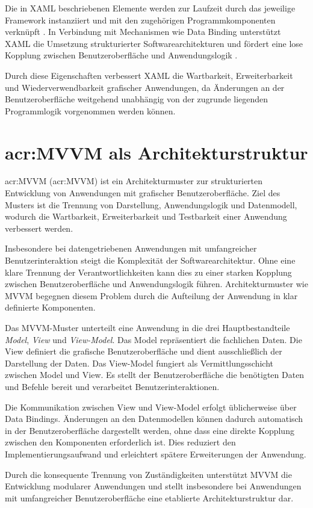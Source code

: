 Die in XAML beschriebenen Elemente werden zur Laufzeit durch das jeweilige Framework instanziiert und mit den zugehörigen Programmkomponenten verknüpft \autocite{adegeoXAMLLanguageOverview}. In Verbindung mit Mechanismen wie Data Binding unterstützt XAML die Umsetzung strukturierter Softwarearchitekturen und fördert eine lose Kopplung zwischen Benutzeroberfläche und Anwendungslogik \autocite{XAMLMitWPF}.

Durch diese Eigenschaften verbessert XAML die Wartbarkeit, Erweiterbarkeit und Wiederverwendbarkeit grafischer Anwendungen, da Änderungen an der Benutzeroberfläche weitgehend unabhängig von der zugrunde liegenden Programmlogik vorgenommen werden können.

  \section{\acrlong{acr:MVVM} als Architekturstruktur}
\acrshort{acr:MVVM} (\acrlong{acr:MVVM}) ist ein Architekturmuster zur strukturierten Entwicklung von Anwendungen mit grafischer Benutzeroberfläche. Ziel des Musters ist die Trennung von Darstellung, Anwendungslogik und Datenmodell, wodurch die Wartbarkeit, Erweiterbarkeit und Testbarkeit einer Anwendung verbessert werden. \autocite{MVVM}

Insbesondere bei datengetriebenen Anwendungen mit umfangreicher Benutzerinteraktion steigt die Komplexität der Softwarearchitektur. Ohne eine klare Trennung der Verantwortlichkeiten kann dies zu einer starken Kopplung zwischen Benutzeroberfläche und Anwendungslogik führen. Architekturmuster wie MVVM begegnen diesem Problem durch die Aufteilung der Anwendung in klar definierte Komponenten. \autocite{MVVM}

Das MVVM-Muster unterteilt eine Anwendung in die drei Hauptbestandteile \textit{Model}, \textit{View} und \textit{View-Model}. Das Model repräsentiert die fachlichen Daten. Die View definiert die grafische Benutzeroberfläche und dient ausschließlich der Darstellung der Daten. Das View-Model fungiert als Vermittlungsschicht zwischen Model und View. Es stellt der Benutzeroberfläche die benötigten Daten und Befehle bereit und verarbeitet Benutzerinteraktionen. \autocite[145--148]{MVVMGarcia}

Die Kommunikation zwischen View und View-Model erfolgt üblicherweise über Data Bindings. Änderungen an den Datenmodellen können dadurch automatisch in der Benutzeroberfläche dargestellt werden, ohne dass eine direkte Kopplung zwischen den Komponenten erforderlich ist. Dies reduziert den Implementierungsaufwand und erleichtert spätere Erweiterungen der Anwendung. \autocite{michaelstonisModelViewViewModelNET}

Durch die konsequente Trennung von Zuständigkeiten unterstützt MVVM die Entwicklung modularer Anwendungen und stellt insbesondere bei Anwendungen mit umfangreicher Benutzeroberfläche eine etablierte Architekturstruktur dar. \autocite{MVVM}




  
  
  